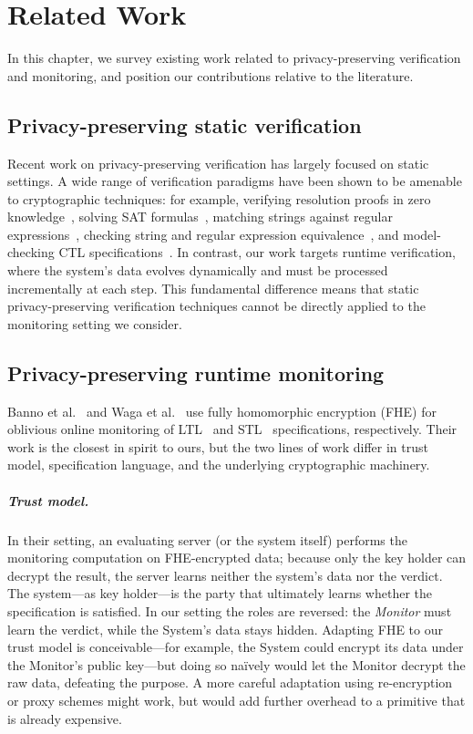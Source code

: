 \chapter{Related Work}\label{ch:related}

In this chapter, we survey existing work related to privacy-preserving verification and monitoring, and position our contributions relative to the literature.

\section{Privacy-preserving static verification}

Recent work on privacy-preserving verification has largely focused on static settings. A wide range of verification paradigms have been shown to be amenable to cryptographic techniques: for example, verifying resolution proofs in zero knowledge~\cite{LAHPTW22}, solving SAT formulas~\cite{LJAPW22}, matching strings against regular expressions~\cite{LWSTRP24}, checking string and regular expression equivalence~\cite{KAAP25}, and model-checking CTL specifications~\cite{JLAP20}. In contrast, our work targets runtime verification, where the system's data evolves dynamically and must be processed incrementally at each step. This fundamental difference means that static privacy-preserving verification techniques cannot be directly applied to the monitoring setting we consider.

\section{Privacy-preserving runtime monitoring}

Banno et al.~\cite{BMMBWS22} and Waga et al.~\cite{WMSMBBS24} use fully homomorphic encryption (FHE) for oblivious online monitoring of LTL~\cite{Pnu77} and STL~\cite{MN04} specifications, respectively. Their work is the closest in spirit to ours, but the two lines of work differ in trust model, specification language, and the underlying cryptographic machinery.

\paragraph{Trust model.}
In their setting, an evaluating server (or the system itself) performs the monitoring computation on FHE-encrypted data; because only the key holder can decrypt the result, the server learns neither the system's data nor the verdict. The system---as key holder---is the party that ultimately learns whether the specification is satisfied. In our setting the roles are reversed: the \emph{Monitor} must learn the verdict, while the System's data stays hidden. Adapting FHE to our trust model is conceivable---for example, the System could encrypt its data under the Monitor's public key---but doing so naïvely would let the Monitor decrypt the raw data, defeating the purpose. A more careful adaptation using re-encryption or proxy schemes might work, but would add further overhead to a primitive that is already expensive.

